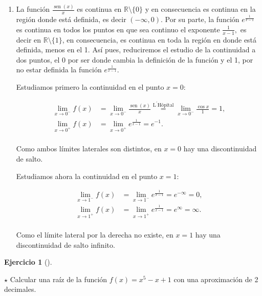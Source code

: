 \documentclass[
  spanish,
  a4paper,
]{scrreport}
\theoremstyle{definition}
\newtheorem{exercise}{Ejercicio}[chapter]
\theoremstyle{remark}
\begin{document}
\begin{tcolorbox}
\begin{enumerate}
  Por último, como ambos límites divergen, se trata también de una
  discontinuidad de primera especie de salto infinito.
\item
  La función \(\frac{\operatorname{sen}(x)}{x}\) es continua en
  \(\mathbb{R}\setminus{\{0\}}\) y en consecuencia es continua en la
  región donde está definida, es decir \((-\infty ,0)\). Por su parte,
  la función \(e^{\frac 1{x-1}}\) es continua en todos los puntos en que
  sea continuo el exponente \(\frac{1}{x-1},\) es decir en
  \(\mathbb{R}\setminus\{1\}\), en consecuencia, es continua en toda la
  región en donde está definida, menos en el 1. Así pues, reduciremos el
  estudio de la continuidad a dos puntos, el 0 por ser donde cambia la
  definición de la función y el 1, por no estar definida la función
  \(e^{\frac{1}{x-1}}.\)

  Estudiamos primero la continuidad en el punto \(x=0\):

  \begin{align*}
   \lim_{x\rightarrow 0^{-}}f(x) &= \lim_{x\rightarrow 0^{-}}\frac{\operatorname{sen}(x)}{x}\stackrel{\text{L}^{\prime }\text{H\^{o}pital}}{=} \lim_{x\rightarrow 0^{-}}\frac{\cos x}{1} = 1,\\
   \lim_{x\rightarrow 0^{+}}f(x) &= \lim_{x\rightarrow 0^{+}}e^{\frac{1}{x-1}} = e^{-1}.\\
   \end{align*}

  Como ambos límites laterales son distintos, en \(x=0\) hay una
  discontinuidad de salto.

  Estudiamos ahora la continuidad en el punto \(x=1\):

  \begin{align*}
   \lim_{x\rightarrow 1^{-}}f(x) &= \lim_{x\rightarrow 1^{-}}e^{\frac{1}{x-1}}=e^{-\infty }=0, \\
   \lim_{x\rightarrow 1^{+}}f(x) &= \lim_{x\rightarrow 1^{+}}e^{\frac{1}{x-1}}=e^\infty = \infty.\\ 
   \end{align*}

  Como el límite lateral por la derecha no existe, en \(x=1\) hay una
  discontinuidad de salto infinito.
\end{enumerate}

\end{tcolorbox}

\begin{exercise}[]\protect\hypertarget{exr-bolzano}{}\label{exr-bolzano}

\(\star\) Calcular una raíz de la función \(f(x)=x^5-x+1\) con una
aproximación de 2 decimales.

\end{exercise}
\end{document}
